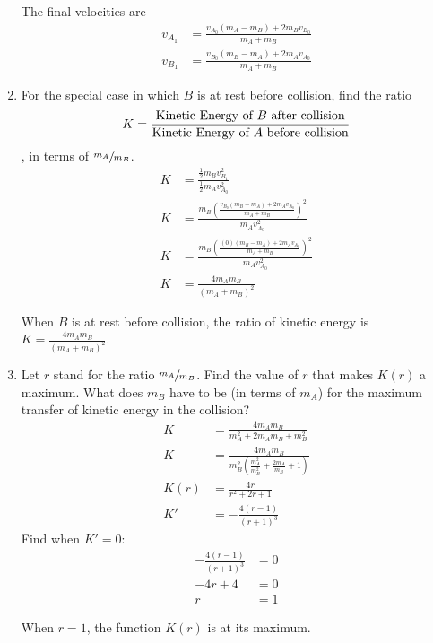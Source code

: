 \documentclass{article}
\begin{document}
\begin{enumerate}[label = \textbf{(\alph*)}]
\begin{mdframed}
			The final velocities are
			\begin{align*}
				v_{A_1} & = \frac{ v_{A_0}(m_A - m_B) + 2m_Bv_{B_0} }{ m_A + m_B } \\
				v_{B_1} & = \frac{ v_{B_0}(m_B - m_A) + 2m_Av_{A_0} }{ m_A + m_B }
			\end{align*}
		\end{mdframed}
	\item For the special case in which $ B $ is at rest before collision, find the ratio $$ K = \frac{ \text{Kinetic Energy of $ B $ after collision} }{ \text{Kinetic Energy of $ A $ before collision} } $$, in terms of $ \sfrac{m_A}{m_B} $.
		\begin{align*}
			K & = \frac{ \frac{1}{2}m_Bv_{B_1}^2 }{ \frac{1}{2}m_Av_{A_0}^2 } \\
			K & = \frac{ m_B \left( \frac{ v_{B_0}(m_B - m_A) + 2m_Av_{A_0} }{ m_A + m_B } \right)^2 }{ m_Av_{A_0}^2 } \\
			K & = \frac{ m_B \left( \frac{ (0)(m_B - m_A) + 2m_Av_{A_0} }{ m_A + m_B } \right)^2 }{ m_Av_{A_0}^2 } \\
			K & = \frac{ 4m_Am_B }{ (m_A + m_B)^2 }
		\end{align*}
		\begin{mdframed}
			When $ B $ is at rest before collision, the ratio of kinetic energy is $ K = \frac{ 4m_Am_B }{ (m_A + m_B)^2 } $.
		\end{mdframed}
	\item Let $ r $ stand for the ratio $ \sfrac{m_A}{m_B} $. Find the value of $ r $ that makes $ K(r) $ a maximum. What does $ m_B $ have to be (in terms of $ m_A $) for the maximum transfer of kinetic energy in the collision?
		\begin{align*}
			K & = \frac{ 4m_Am_B }{ m_A^2 + 2m_Am_B + m_B^2 } \\
			K & = \frac{ 4m_Am_B }{ m_B^2 \left( \frac{ m_A^2 }{ m_B^2 } + \frac{ 2m_A }{ m_B } + 1 \right) } \\
			K(r) & = \frac{ 4r }{ r^2 + 2r + 1 } \\
			K' & = - \frac{ 4(r - 1) }{ (r + 1)^3 }
		\end{align*}
		Find when $ K' = 0 $:
		\begin{align*}
			- \frac{ 4(r - 1) }{ (r + 1)^3 } & = 0 \\
			-4r + 4 & = 0 \\
			r & = 1
		\end{align*}
		\begin{mdframed}
			When $ r = 1 $, the function $ K(r) $ is at its maximum.
		\end{mdframed}
\end{enumerate}
\end{document}
